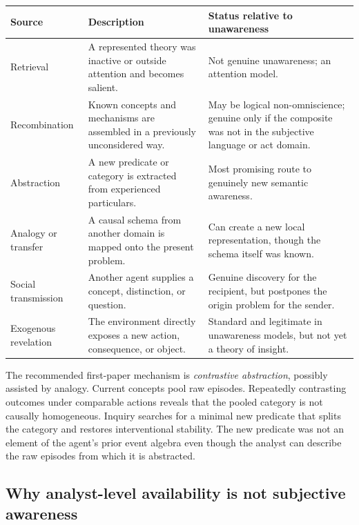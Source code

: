 \documentclass[11pt]{article}
\begin{document}
	\begin{center}
		\small
		\begin{tabularx}{\textwidth}{@{}p{}X p{}@{}}
			\toprule
			\textbf{Source} & \textbf{Description} & \textbf{Status relative to unawareness} \\
			\midrule
			Retrieval & A represented theory was inactive or outside attention and becomes salient. & Not genuine unawareness; an attention model. \\
			Recombination & Known concepts and mechanisms are assembled in a previously unconsidered way. & May be logical non-omniscience; genuine only if the composite was not in the subjective language or act domain. \\
			Abstraction & A new predicate or category is extracted from experienced particulars. & Most promising route to genuinely new semantic awareness. \\
			Analogy or transfer & A causal schema from another domain is mapped onto the present problem. & Can create a new local representation, though the schema itself was known. \\
			Social transmission & Another agent supplies a concept, distinction, or question. & Genuine discovery for the recipient, but postpones the origin problem for the sender. \\
			Exogenous revelation & The environment directly exposes a new action, consequence, or object. & Standard and legitimate in unawareness models, but not yet a theory of insight. \\
			\bottomrule
		\end{tabularx}
	\end{center}
	
	The recommended first-paper mechanism is \emph{contrastive abstraction}, possibly assisted by analogy.  Current concepts pool raw episodes.  Repeatedly contrasting outcomes under comparable actions reveals that the pooled category is not causally homogeneous.  Inquiry searches for a minimal new predicate that splits the category and restores interventional stability.  The new predicate was not an element of the agent's prior event algebra even though the analyst can describe the raw episodes from which it is abstracted.
	
	\subsection{Why analyst-level availability is not subjective awareness}
	
\end{document}
